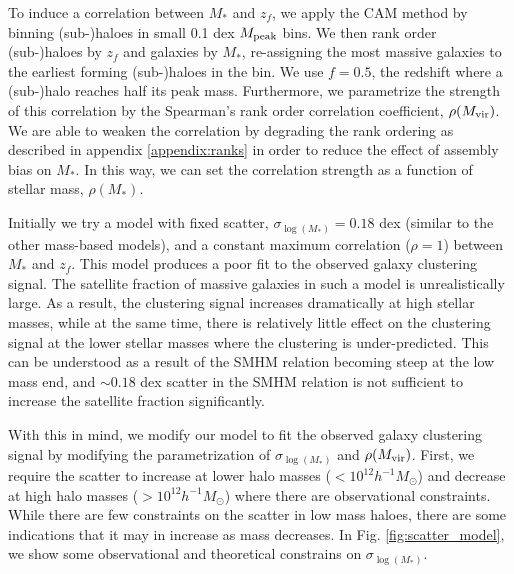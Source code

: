 \documentclass[a4paper,fleqn,usenatbib]{mnras}
\begin{document}
To induce a correlation between $M_{*}$ and $z_{f}$, we apply the CAM method by binning (sub-)haloes in small 0.1 dex $M_{\rm peak}$ bins.  We then rank order (sub-)haloes by $z_{f}$ and galaxies by $M_{*}$, re-assigning the most massive galaxies to the earliest forming (sub-)haloes in the bin.  We use ${f}=0.5$, the redshift where a (sub-)halo reaches half its peak mass.  Furthermore, we parametrize the strength of this correlation by the Spearman's rank order correlation coefficient, $\rho(M_{\rm vir})$.  We are able to weaken the correlation by degrading the rank ordering as described in appendix \ref{appendix:ranks} in order to reduce the effect of assembly bias on $M_*$.  In this way, we can set the correlation strength as a function of stellar mass, $\rho(M_*)$.

Initially we try a model with fixed scatter, $\sigma_{\log(M_*)} = 0.18$ dex (similar to the other mass-based models), and a constant maximum correlation ($\rho=1$) between $M_{*}$ and $z_f$.  This model produces a poor fit to the observed galaxy clustering signal.  The satellite fraction of massive galaxies in such a model is unrealistically large.  As a result, the clustering signal increases dramatically at high stellar masses, while at the same time, there is relatively little effect on the clustering signal at the lower stellar masses where the clustering is under-predicted.  This can be understood as a result of the SMHM relation becoming steep at the low mass end, and $\sim 0.18$ dex scatter in the SMHM relation is not sufficient to increase the satellite fraction significantly.

With this in mind, we modify our model to fit the observed galaxy clustering signal by modifying the parametrization of $\sigma_{\log(M_*)}$ and $\rho(M_{\rm vir})$.  First, we require the scatter to increase at lower halo masses ($<10^{12}h^{-1}M_{\odot}$) and decrease at high halo masses ($>10^{12}h^{-1}M_{\odot}$) where there are observational constraints.  While there are few constraints on the scatter in low mass haloes, there are some indications that it may in increase as mass decreases. In Fig. \ref{fig:scatter_model}, we show some observational and theoretical constrains on $\sigma_{\log(M_*)}$.  
\end{document}
